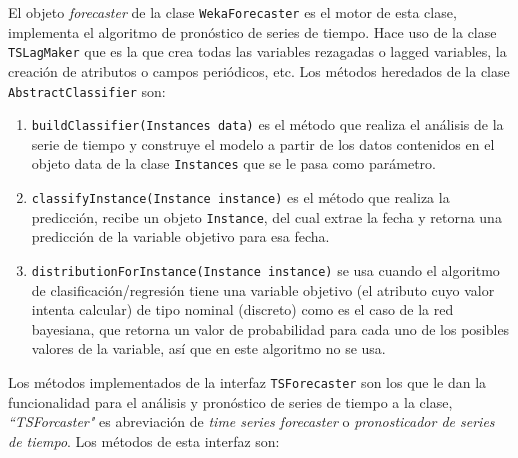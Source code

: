 El objeto \textit{forecaster} de la clase \texttt{WekaForecaster} es el motor de esta clase, implementa el algoritmo de pronóstico de series de tiempo. Hace uso de la clase \texttt{TSLagMaker} que es la que crea todas las variables rezagadas o lagged variables, la creación de atributos o campos periódicos, etc.
Los métodos heredados de la clase \texttt{AbstractClassifier} son:
\begin{enumerate}
	\item \texttt{buildClassifier(Instances data)} es el método que realiza el análisis de la serie de tiempo y construye el modelo 		a partir de los datos contenidos en el objeto data de la clase \texttt{Instances} que se le pasa como parámetro.
	
	\item \texttt{classifyInstance(Instance instance)} es el método que realiza la predicción, recibe un objeto \texttt{Instance}, del cual 	extrae la fecha y retorna una predicción de la variable objetivo para esa fecha.
	
	\item  \texttt{distributionForInstance(Instance instance)} se usa cuando el algoritmo de clasificación/regresión tiene una 				variable objetivo (el atributo cuyo valor intenta calcular) de tipo nominal (discreto) como es el caso de la red bayesiana, que 		retorna un valor de probabilidad para cada uno de los posibles valores de la variable, así que en este algoritmo no se usa.
\end{enumerate}
Los métodos implementados de la interfaz \texttt{TSForecaster} son los que le dan la funcionalidad para el análisis y pronóstico de series de tiempo a la clase, \textit{``TSForcaster"} es abreviación de \textit{time series forecaster} o \textit{pronosticador de series de tiempo}. Los métodos de esta interfaz son: 
